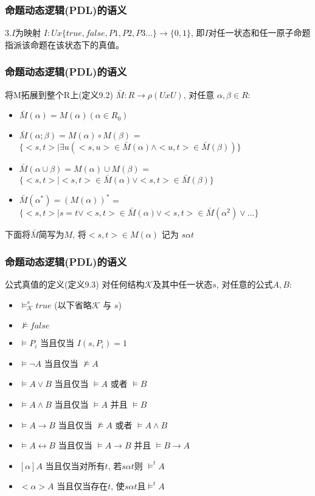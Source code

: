 \documentclass{beamer}
\begin{document}
\begin{frame}
	\frametitle{命题动态逻辑(PDL)的语义}
	\begin{block}{3.$I$为映射}
		$I: Ux\{true,false,P1,P2,P3...\} \rightarrow \{0,1\}$, 即$I$对任一状态和任一原子命题指派该命题在该状态下的真值。
	\end{block}
\end{frame}



\begin{frame}
	\frametitle{命题动态逻辑(PDL)的语义}
	\begin{block}{将M拓展到整个R上(定义9.2)}
		$\bar{M}: R \rightarrow \rho(UxU)$, 对任意 $\alpha, \beta \in R$:
		\begin{itemize}
			\item $\bar{M}(\alpha) = M(\alpha)  (\alpha \in R_0)$
			\item $\bar{M}(\alpha ; \beta) = M(\alpha) \circ M(\beta)$ = $\{<s,t> | \exists u(<s,u> \in \bar{M}(\alpha) \wedge <u,t> \in \bar{M}(\beta) ) \}$
			\item $\bar{M}(\alpha \cup \beta) = M(\alpha) \cup M(\beta)$ = $\{<s,t> | <s,t> \in \bar{M}(\alpha) \vee <s,t> \in \bar{M}(\beta) \}$
			\item $\bar{M}(\alpha ^ {*}) = (M(\alpha))^{*}$ = $\{<s,t> | s = t \vee <s,t> \in \bar{M}(\alpha) \vee <s,t> \in \bar{M}(\alpha ^{2}) \vee ... \}$
		\end{itemize}
		下面将$\bar{M}$简写为$M$, 将$<s,t> \in M(\alpha)$ 记为 $s \alpha t$
	\end{block}
\end{frame}


\begin{frame}
	\frametitle{命题动态逻辑(PDL)的语义}
	\begin{block}{公式真值的定义(定义9.3)}
		对任何结构$\mathcal{K}$及其中任一状态$s$, 对任意的公式$A,B$:
		\begin{itemize}
			\item $\models_{\mathcal{K}} ^ {s} true $ (以下省略$\mathcal{K}$ 与 $s$)
			\item $\not \models false $
			\item $ \models P_i $ 当且仅当 $I(s,P_i) = 1$
			\item $ \models \neg A $ 当且仅当 $\not \models A $
			\item $ \models A \vee B $ 当且仅当 $\models A$ 或者 $\models B$
			\item $ \models A \wedge B $ 当且仅当 $\models A$ 并且 $\models B$
			\item $ \models A \rightarrow B $ 当且仅当 $\not \models A$ 或者 $\models A\wedge B$
			\item $ \models A \leftrightarrow B $ 当且仅当 $\models A \rightarrow B $ 并且 $\models B \rightarrow A$
			\item $[\alpha]A$ 当且仅当对所有$t$, 若$s\alpha t$则 $\models ^{t} A$
			\item $<\alpha>A$ 当且仅当存在$t$, 使$s\alpha t$且$\models ^{t} A$
		\end{itemize}
	\end{block}
\end{frame}
\end{document}
